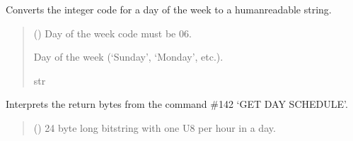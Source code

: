 \documentclass[letterpaper,10pt,english]{sphinxmanual}
\begin{document}
\begin{fulllineitems}
\begin{fulllineitems}
\label{\detokenize{PodApi.Devices:PodApi.Devices.PodDevice_8229.Pod8229.DecodeDayOfWeek}}
\pysigstartsignatures
{}
\pysigstopsignatures
\sphinxAtStartPar
Converts the integer code for a day of the week to a human\sphinxhyphen{}readable string.
\begin{quote}\begin{description}
\sphinxAtStartPar
{} () \textendash{} Day of the week code must be 0\sphinxhyphen{}6.

\sphinxAtStartPar
Day of the week (‘Sunday’, ‘Monday’, etc.).

\sphinxAtStartPar
str

\end{description}\end{quote}

\end{fulllineitems}


\begin{fulllineitems}
\label{\detokenize{PodApi.Devices:PodApi.Devices.PodDevice_8229.Pod8229.DecodeDaySchedule}}
\pysigstartsignatures
{}
\pysigstopsignatures
\sphinxAtStartPar
Interprets the return bytes from the command \#142 ‘GET DAY SCHEDULE’.
\begin{quote}\begin{description}
\sphinxAtStartPar
{} () \textendash{} 24 byte long bitstring with one U8 per hour in a day.


\end{description}
\end{quote}
\end{fulllineitems}
\end{fulllineitems}
\end{document}
